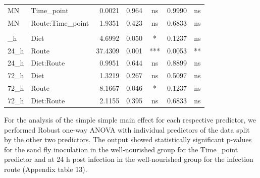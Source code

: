 \documentclass[
  12pt,
  letterpaper,
]{article}
\begin{document}
\begin{longtable}{l|lrrcrc}
MN & Time\_point & 0.0021 & 0.964 & ns & 0.9990 & ns \\ 
MN & Route:Time\_point & 1.9351 & 0.423 & ns & 0.6833 & ns \\ 
\midrule\addlinespace[2.5pt]
\multicolumn{7}{l}{Grouped by Time\_point} \\[2.5pt] 
\midrule\addlinespace[2.5pt]
24\_h & Diet & 4.6992 & 0.050 & * & 0.1237 & ns \\ 
24\_h & Route & 37.4309 & 0.001 & *** & 0.0053 & ** \\ 
24\_h & Diet:Route & 0.9951 & 0.644 & ns & 0.8899 & ns \\ 
72\_h & Diet & 1.3219 & 0.267 & ns & 0.5097 & ns \\ 
72\_h & Route & 8.1667 & 0.046 & * & 0.1237 & ns \\ 
72\_h & Diet:Route & 2.1155 & 0.395 & ns & 0.6833 & ns \\ 
\bottomrule
\end{longtable}
\endgroup

For the analysis of the simple simple main effect for each respective predictor, we performed Robust one-way ANOVA with individual predictors of the data split by the other two predictors. The output showed statistically significant p-values for the sand fly inoculation in the well-nourished group for the Time\_point predictor and at 24 h post infection in the well-nourished group for the infection route (Appendix table 13).
\end{document}
